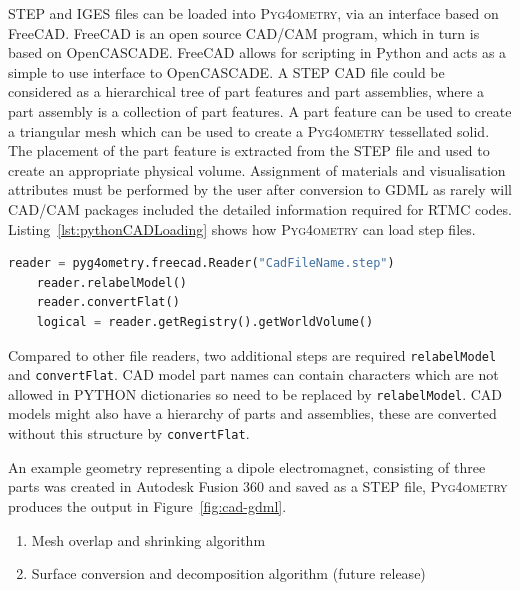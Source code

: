 \documentclass[final,5p,times,twocolumn]{elsarticle}
\newcommand{\pyinline}[1]{\lstinline[postbreak={}]{#1}}
\newcommand{\PYGEOMETRY}{\textsc{Pyg4ometry}}
\begin{document}
STEP and IGES files can be loaded into \PYGEOMETRY{}, via an interface 
based on FreeCAD. FreeCAD is an open source CAD/CAM program, which 
in turn is based on OpenCASCADE. FreeCAD allows for scripting in Python 
and acts as a simple to use interface to OpenCASCADE.  A STEP CAD file 
could be considered as a hierarchical tree of part features and part assemblies, 
where a part assembly is a collection of part features. A part feature can be used 
to create a triangular mesh which can be used to create a \PYGEOMETRY{} tessellated solid. The placement 
of the part feature is extracted from the STEP file and used to create an 
appropriate physical volume. Assignment of materials and visualisation 
attributes must be performed by  the user after conversion to GDML as rarely 
will CAD/CAM packages included the detailed information required for RTMC 
codes. Listing~\ref{lst:pythonCADLoading} shows 
how \PYGEOMETRY{} can load step files.
\begin{lstlisting}[caption={A simple \PYGEOMETRY{} Python script to load a STEP file.},label={lst:pythonCADLoading}, language=Python]
    reader = pyg4ometry.freecad.Reader("CadFileName.step")
    reader.relabelModel()
    reader.convertFlat()
    logical = reader.getRegistry().getWorldVolume()
\end{lstlisting}
Compared to other file readers, two additional steps are required \pyinline{relabelModel} and \pyinline{convertFlat}. CAD model 
part names can contain characters which are not allowed in PYTHON dictionaries so need to be replaced by \pyinline{relabelModel}. 
CAD models might also have a hierarchy of parts and assemblies, these are converted without this structure by \pyinline{convertFlat}.

An example geometry representing a dipole electromagnet, consisting of three parts was created in Autodesk Fusion 360
and saved as a STEP file, \PYGEOMETRY{} produces the output in Figure~\ref{fig:cad-gdml}.

\begin{enumerate}
\item Mesh overlap and shrinking algorithm 
\item Surface conversion and decomposition algorithm (future release)
\end{enumerate}
\end{document}
